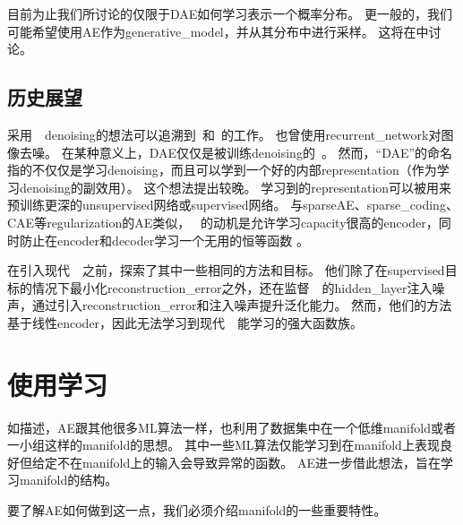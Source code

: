 
目前为止我们所讨论的仅限于\gls{DAE}如何学习表示一个概率分布。
更一般的，我们可能希望使用\gls{AE}作为\gls{generative_model}，并从其分布中进行采样。
这将在中讨论。


\subsection{历史展望}
\label{sec:historical_perspective_chap14}
采用~~\gls{denoising}的想法可以追溯到~\cite{Lecun-these87}和~\citet{Gallinari87}的工作。
\citet{Behnke-2001}也曾使用\gls{recurrent_network}对图像去噪。
在某种意义上，\gls{DAE}仅仅是被训练\gls{denoising}的~。
然而，``\gls{DAE}''的命名指的不仅仅是学习\gls{denoising}，而且可以学到一个好的内部\gls{representation}（作为学习\gls{denoising}的副效用）。
这个想法提出较晚\citep{VincentPLarochelleH2008-small,Vincent-JMLR-2010-small}。
学习到的\gls{representation}可以被用来预训练更深的\gls{unsupervised}网络或\gls{supervised}网络。
与\gls{sparse}\gls{AE}、\gls{sparse_coding}、\gls{CAE}等\gls{regularization}的\gls{AE}类似， ~的动机是允许学习\gls{capacity}很高的\gls{encoder}，同时防止在\gls{encoder}和\gls{decoder}学习一个无用的恒等函数 。


在引入现代~~之前，\citet{Inayoshi-and-Kurita-2005}探索了其中一些相同的方法和目标。
他们除了在\gls{supervised}目标的情况下最小化\gls{reconstruction_error}之外，还在监督~~的\gls{hidden_layer}注入噪声，通过引入\gls{reconstruction_error}和注入噪声提升泛化能力。
然而，他们的方法基于线性\gls{encoder}，因此无法学习到现代~~能学习的强大函数族。



\section{使用学习}
\label{sec:learning_manifolds_with_autoencoders}

如描述，\gls{AE}跟其他很多\gls{ML}算法一样，也利用了数据集中在一个低维\gls{manifold}或者一小组这样的\gls{manifold}的思想。
其中一些\gls{ML}算法仅能学习到在\gls{manifold}上表现良好但给定不在\gls{manifold}上的输入会导致异常的函数。
\gls{AE}进一步借此想法，旨在学习\gls{manifold}的结构。


要了解\gls{AE}如何做到这一点，我们必须介绍\gls{manifold}的一些重要特性。


